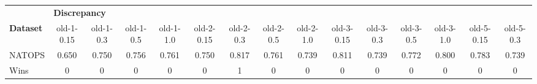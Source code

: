 \begin{tabular}{lcccccccccccccc}
\toprule
{} & \multicolumn{14}{l}{\textbf{Discrepancy}} \\
 \textbf{Dataset} &           old-1-0.15 & old-1-0.3 & old-1-0.5 & old-1-1.0 & old-2-0.15 & old-2-0.3 & old-2-0.5 & old-2-1.0 & old-3-0.15 & old-3-0.3 & old-3-0.5 & old-3-1.0 & old-5-0.15 & old-5-0.3 \\
\midrule
NATOPS &                0.650 &     0.750 &     0.756 &     0.761 &      0.750 &     0.817 &     0.761 &     0.739 &      0.811 &     0.739 &     0.772 &     0.800 &      0.783 &     0.739 \\ 
\midrule
Wins &           0 &          0 &          0 &          0 &           0 &          1 &          0 &          0 &           0 &          0 &          0 &          0 &           0 &          0 \\
\bottomrule
\end{tabular}
